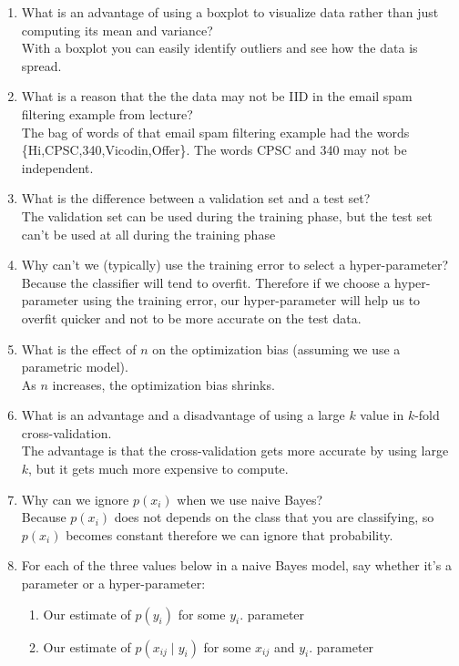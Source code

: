 \documentclass{article}
\def\ans#1{{\color{ans}#1}}
\def\cond{\; | \;}
\def\enum#1{\begin{enumerate}#1\end{enumerate}}
\begin{document}
\enum{
\item What is an advantage of using a boxplot to visualize data rather than just computing its mean and variance? \\
\ans{
   With a boxplot you can easily identify outliers and see how the data is spread.
}
\item What is a reason that the the data may not be IID in the email spam filtering example from lecture? \\
\ans{
   The bag of words of that email spam filtering example had the words \{Hi,CPSC,340,Vicodin,Offer\}. 
   The words CPSC and 340 may not be independent.
}
\item What is the difference between a validation set and a test set? \\
\ans{
   The validation set can be used during the training phase, but the test set can't be used at all 
   during the training phase
}
\item Why can't we (typically) use the training error to select a hyper-parameter? \\
\ans{
   Because the classifier will tend to overfit. Therefore if we choose a hyper-parameter using the 
   training error, our hyper-parameter will help us to overfit quicker and not to be more accurate on 
   the test data.
}
\item What is the effect of $n$ on the optimization bias (assuming we use a parametric model). \\
\ans{
   As $n$ increases, the optimization bias shrinks.
}
\item What is an advantage and a disadvantage of using a large $k$ value in $k$-fold cross-validation. \\
\ans{
   The advantage is that the cross-validation gets more accurate by using large $k$, but it gets 
   much more expensive to compute.
}
\item Why can we ignore $p(x_i)$ when we use naive Bayes? \\
\ans{
   Because $p(x_i)$ does not depends on the class that you are classifying, so $p(x_i)$ becomes constant 
   therefore we can ignore that probability.
}
\item For each of the three values below in a naive Bayes model, say whether it's a parameter or a hyper-parameter: \\
\begin{enumerate}
\item Our estimate of $p(y_i)$ for some $y_i$. \ans{parameter}
\item Our estimate of $p(x_{ij} \cond y_i)$ for some $x_{ij}$ and $y_i$. \ans{parameter}

\end{enumerate}}
\end{document}

